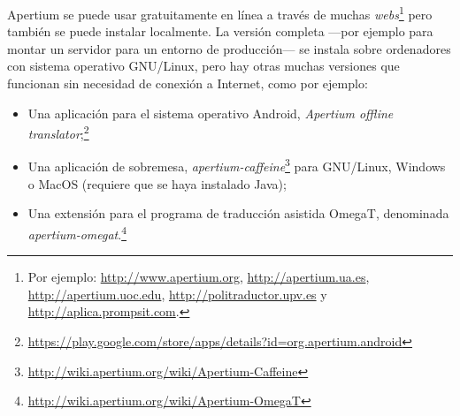 Apertium se puede usar gratuitamente en línea a través de muchas \emph{webs}\footnote{Por ejemplo: \url{http://www.apertium.org}, \url{http://apertium.ua.es}, \url{http://apertium.uoc.edu}, \url{http://politraductor.upv.es} y \url{http://aplica.prompsit.com}.}  pero también se puede instalar localmente. La versión completa ---por ejemplo para montar un servidor para un entorno de producción--- se instala sobre ordenadores con sistema operativo GNU/Linux, pero hay otras muchas versiones que funcionan sin necesidad de conexión a Internet, como por ejemplo: \begin{itemize} \item Una aplicación para el sistema operativo Android, \emph{Apertium offline translator};\footnote{\url{https://play.google.com/store/apps/details?id=org.apertium.android}} \item Una aplicación de sobremesa, \emph{apertium-caffeine}\footnote{\url{http://wiki.apertium.org/wiki/Apertium-Caffeine}} para GNU/Linux, Windows o MacOS (requiere que se haya instalado Java); \item Una extensión para el programa de traducción asistida OmegaT, denominada \emph{apertium-omegat}.\footnote{\url{http://wiki.apertium.org/wiki/Apertium-OmegaT}} \end{itemize} 

